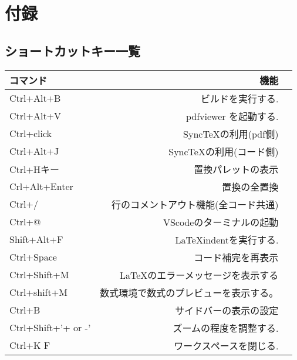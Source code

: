 \documentclass{ltjsarticle}
\begin{document}
\section*{付録}
\subsection*{ショートカットキー一覧}
\begin{center}
  \begin{tabular}{lrr} \hline
    コマンド            & 機能                  \\ \hline
    Ctrl+Alt+B          & ビルドを実行する.           \\
    Ctrl+Alt+V          & pdfviewer を起動する.    \\
    Ctrl+click          & SyncTeXの利用(pdf側)    \\
    Ctrl+Alt+J          & SyncTeXの利用(コード側)    \\
    Ctrl+Hキー            & 置換パレットの表示           \\
    Crl+Alt+Enter       & 置換の全置換              \\
    Ctrl+/              & 行のコメントアウト機能(全コード共通) \\
    Ctrl+@              & VScodeのターミナルの起動     \\
    Shift+Alt+F         & LaTeXindentを実行する.\\
    Ctrl+Space          & コード補完を再表示\\
    Ctrl+Shift+M        & \LaTeX のエラーメッセージを表示する\\
    Ctrl+shift+M & 数式環境で数式のプレビューを表示する。\\ 
    Ctrl+B              & サイドバーの表示の設定\\
    Ctrl+Shift+'+ or -' & ズームの程度を調整する.        \\
    Ctrl+K F            & ワークスペースを閉じる.\\ \hline
  \end{tabular}
\end{center}
\end{document}
